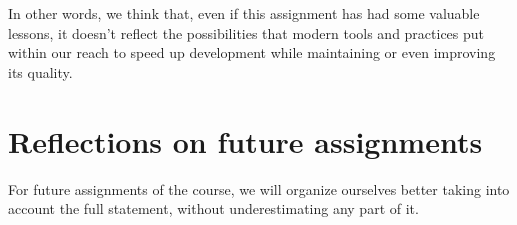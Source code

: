 \documentclass{article}
\begin{document}
In other words, we think that, even if this assignment has had some valuable lessons, it doesn't reflect the possibilities that modern tools and practices put within our reach to speed up development while maintaining or even improving its quality.

\section{Reflections on future assignments}

For future assignments of the course, we will organize ourselves better taking into account the full statement, without underestimating any part of it.
\end{document}
